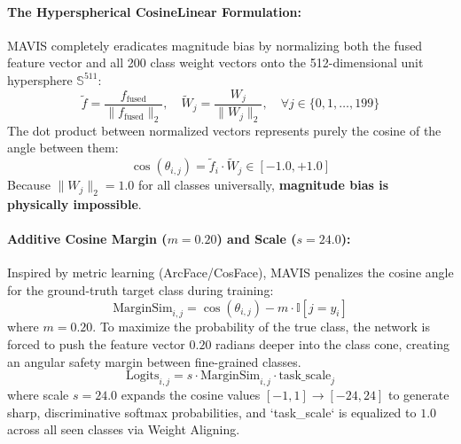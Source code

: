 \documentclass[11pt,a4paper]{article}
\begin{document}
\paragraph{The Hyperspherical CosineLinear Formulation:}
MAVIS completely eradicates magnitude bias by normalizing both the fused feature vector and all 200 class weight vectors onto the 512-dimensional unit hypersphere $\mathbb{S}^{511}$:
\begin{equation}
\tilde{f} = \frac{f_{\text{fused}}}{\|f_{\text{fused}}\|_2}, \quad \tilde{W}_j = \frac{W_j}{\|W_j\|_2}, \quad \forall j \in \{0, 1, \dots, 199\}
\end{equation}
The dot product between normalized vectors represents purely the cosine of the angle between them:
\begin{equation}
\cos(\theta_{i, j}) = \tilde{f}_i \cdot \tilde{W}_j \in [-1.0, +1.0]
\end{equation}
Because $\|W_j\|_2 = 1.0$ for all classes universally, \textbf{magnitude bias is physically impossible}.

\paragraph{Additive Cosine Margin ($m = 0.20$) and Scale ($s = 24.0$):}
Inspired by metric learning (ArcFace/CosFace), MAVIS penalizes the cosine angle for the ground-truth target class during training:
\begin{equation}
\text{MarginSim}_{i, j} = \cos(\theta_{i, j}) - m \cdot \mathbb{I}[j = y_i]
\end{equation}
where $m = 0.20$. To maximize the probability of the true class, the network is forced to push the feature vector $0.20$ radians deeper into the class cone, creating an angular safety margin between fine-grained classes.
\begin{equation}
\text{Logits}_{i, j} = s \cdot \text{MarginSim}_{i, j} \cdot \text{task\_scale}_j
\end{equation}
where scale $s = 24.0$ expands the cosine values $[-1, 1] \to [-24, 24]$ to generate sharp, discriminative softmax probabilities, and `task_scale` is equalized to $1.0$ across all seen classes via Weight Aligning.
\end{document}
